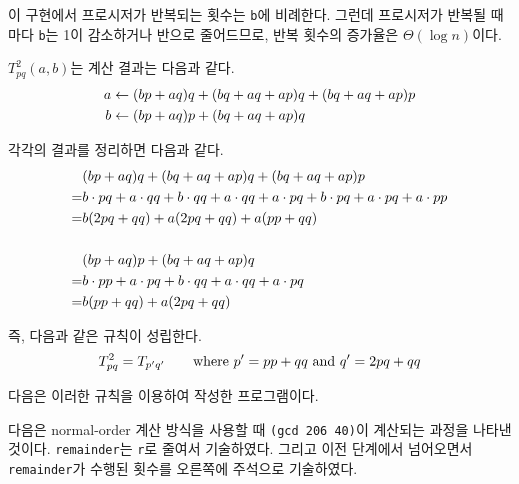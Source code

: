 
이 구현에서 프로시저가 반복되는 횟수는 \texttt{b}에 비례한다. 그런데
프로시저가 반복될 때마다 \texttt{b}는 1이 감소하거나 반으로 줄어드므로, 반복
횟수의 증가율은 $\Theta(\log n)$이다.





$T_{pq}^2(a,b)$는 계산 결과는 다음과 같다.
\begin{align}
  a &\leftarrow (bp+aq)q + (bq+aq+ap)q + (bq+aq+ap)p \notag\\
  b &\leftarrow (bp+aq)p + (bq+aq+ap)q \notag
\end{align}

각각의 결과를 정리하면 다음과 같다.
\begin{align}
    & (bp+aq)q + (bq+aq+ap)q + (bq+aq+ap)p \notag\\
   =& b\cdot pq + a\cdot qq + b\cdot qq + a\cdot qq + a\cdot pq
      + b\cdot pq + a\cdot pq + a\cdot pp \notag\\
   =& b(2pq + qq) + a(2pq + qq) + a(pp+qq) \notag\\
   \notag\\
    & (bp+aq)p + (bq+aq+ap)q \notag\\
   =& b\cdot pp + a\cdot pq + b\cdot qq + a\cdot qq + a\cdot pq \notag\\
   =& b(pp+qq) + a(2pq+qq) \notag
\end{align}

즉, 다음과 같은 규칙이 성립한다.
\begin{equation}\notag
  T_{pq}^2 = T_{p'q'} \qquad \text{where } p'=pp+qq \text{~and~} q'=2pq+qq
\end{equation}

다음은 이러한 규칙을 이용하여 작성한 프로그램이다.


다음은 normal-order 계산 방식을 사용할 때 \texttt{(gcd 206 40)}이 계산되는
과정을 나타낸 것이다. \texttt{remainder}는 \texttt{r}로 줄여서
기술하였다. 그리고 이전 단계에서 넘어오면서 \texttt{remainder}가 수행된 횟수를
오른쪽에 주석으로 기술하였다.

